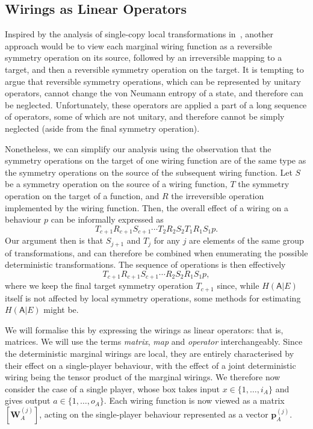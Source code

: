 \documentclass[10pt, a4paper]{article}
\numberwithin{equation}{section} %
\theoremstyle{definition}
\theoremstyle{plain}
\newcommand{\dintv}[2]{\mathopen\{#1,\ldots,#2\mathclose\}}
\newcommand{\?}{\mathrel{?}} %
\newcommand{\cvec}[1]{\boldsymbol{\mathbf{#1}}}    %
\newcommand{\matrp}[2]{\left[\mathbf{#1}#2\right]} %
\newcommand{\crv}[1]{\mathsf{#1}}
\begin{document}
      \subsection{Wirings as Linear Operators}

      Inspired by the analysis of single-copy local transformations in~\cite{LocalTransformations}, another approach would be to view each marginal wiring function as a reversible symmetry operation on its source, followed by an irreversible mapping to a target, and then a reversible symmetry operation on the target. It is tempting to argue that reversible symmetry operations, which can be represented by unitary operators, cannot change the von Neumann entropy of a state, and therefore can be neglected. Unfortunately, these operators are applied a part of a long sequence of operators, some of which are not unitary, and therefore cannot be simply neglected (aside from the final symmetry operation).

      Nonetheless, we can simplify our analysis using the observation that the symmetry operations on the target of one wiring function are of the same type as the symmetry operations on the source of the subsequent wiring function. Let \(S\) be a symmetry operation on the source of a wiring function, \(T\) the symmetry operation on the target of a function, and \(R\) the irreversible operation implemented by the wiring function. Then, the overall effect of a wiring on a behaviour \(p\) can be informally expressed as
      \[ T_{c+1}R_{c+1}S_{c+1} \cdots T_2R_2S_2 T_1R_1S_1 p. \]
      Our argument then is that \(S_{j+1}\) and \(T_{j}\) for any \(j\) are elements of the same group of transformations, and can therefore be combined when enumerating the possible deterministic transformations. The sequence of operations is then effectively
      \[ T_{c+1}R_{c+1}S_{c+1} \cdots R_2S_2 R_1S_1 p, \]
      where we keep the final target symmetry operation \(T_{c+1}\) since, while \(H(\crv{A}|E)\) itself is not affected by local symmetry operations, some methods for estimating \(H(\crv{A}|E)\) might be.

      We will formalise this by expressing the wirings as linear operators: that is, matrices. We will use the terms \emph{matrix}, \emph{map} and \emph{operator} interchangeably. Since the deterministic marginal wirings are local, they are entirely characterised by their effect on a single-player behaviour, with the effect of a joint deterministic wiring being the tensor product of the marginal wirings. We therefore now consider the case of a single player, whose box takes input \(x \in \dintv{1}{i_A}\) and gives output \(a \in \dintv{1}{o_A}\). Each wiring function is now viewed as a matrix \(\matrp{W}{_A^{(j)}}\), acting on the single-player behaviour represented as a vector \(\cvec{p}^{(j)}_A\).
\end{document}
